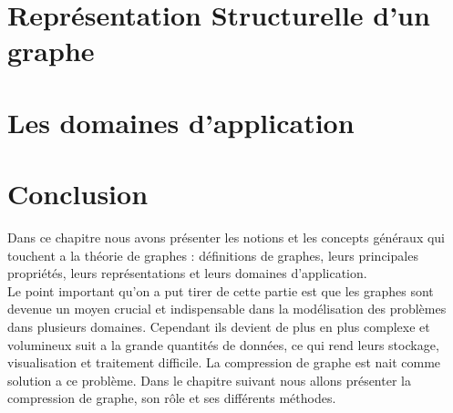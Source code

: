     	\section{Représentation Structurelle d'un graphe}	
		
	
	\section{Les domaines d'application}
			
		
	
	
			
	\section{Conclusion}
Dans ce chapitre nous avons présenter les notions et les concepts généraux qui touchent a la théorie de graphes : définitions de graphes, leurs principales propriétés, leurs représentations et leurs domaines d'application.\\
Le point important qu'on a put tirer de cette partie est que les graphes sont devenue un moyen crucial et indispensable dans la modélisation des problèmes dans plusieurs domaines. Cependant ils devient de plus en plus complexe et volumineux suit a la grande quantités de données, ce qui rend leurs stockage, visualisation et traitement difficile. La compression de graphe est nait comme solution a ce problème. Dans le chapitre suivant nous allons présenter la compression de graphe, son rôle et ses différents méthodes.  
	
	